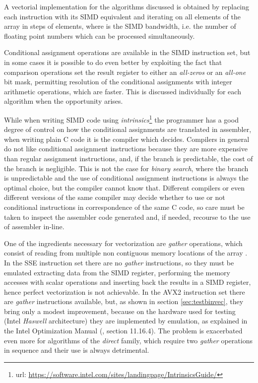 \documentclass[preprint,1p,times]{elsarticle}
\begin{document}
A vectorial implementation for the algorithms discussed is obtained by replacing each instruction with its SIMD equivalent and iterating on all elements of the array  in steps of  elements, where  is the SIMD bandwidth, i.e. the number of floating point numbers which can be processed simultaneously.

Conditional assignment operations are available in the SIMD instruction set, but in some cases it is possible to do even better by exploiting the fact that comparison operations set the result register to either an \textit{all-zeros} or an \textit{all-one} bit mask, permitting resolution of the conditional assignments with integer arithmetic operations, which are faster. This is discussed individually for each algorithm when the opportunity arises.

While when writing SIMD code using \textit{intrinsics}\footnote{url: \url{https://software.intel.com/sites/landingpage/IntrinsicsGuide/}} the programmer has a good degree of control on how the conditional assignments are translated in assembler, when writing plain C code it is the compiler which decides. Compilers in general do not like conditional assignment instructions because they are more expensive than regular assignment instructions, and, if the branch is predictable, the cost of the branch is negligible. This is not the case for \textit{binary search}, where the branch is unpredictable and the use of conditional assignment instructions is always the optimal choice, but the compiler cannot know that. Different compilers or even different versions of the same compiler may decide whether to use or not conditional instructions in correspondence of the same C code, so care must be taken to inspect the assembler code generated and, if needed, recourse to the use of assembler in-line.

One of the ingredients necessary for vectorization are \textit{gather} operations, which consist of reading from multiple non contiguous memory locations of the array .
In the SSE instruction set there are no \textit{gather} instructions, so they must be emulated extracting data from the SIMD register, performing the memory accesses with scalar operations and inserting back the results in a SIMD register, hence perfect vectorization is not achievable.
In the AVX2 instruction set there are \textit{gather} instructions available, but, as shown in section \ref{sec:testbinvec}, they bring only a modest improvement, because on the hardware used for testing (Intel \textit{Haswell} architecture) they are implemented by emulation, as explained in the Intel Optimization Manual (\cite{Intel2016}, section 11.16.4). The problem is exacerbated even more for algorithms of the \textit{direct} family, which require two \textit{gather} operations in sequence and their use is always detrimental.
\end{document}
